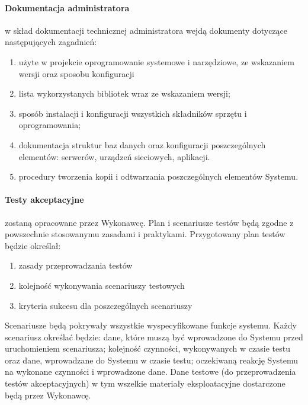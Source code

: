\documentclass{article}
\begin{document}
\paragraph{Dokumentacja administratora}  w skład dokumentacji technicznej administratora wejdą dokumenty dotyczące następujących zagadnień: 
\begin{enumerate}
	\item użyte w projekcie oprogramowanie systemowe i narzędziowe, ze wskazaniem wersji oraz sposobu konfiguracji
	\item lista wykorzystanych bibliotek wraz ze wskazaniem wersji; 
	\item sposób instalacji i konfiguracji wszystkich składników sprzętu i oprogramowania; 
	\item dokumentacja struktur baz danych oraz konfiguracji poszczególnych elementów: serwerów, urządzeń sieciowych, aplikacji. 
	\item procedury tworzenia kopii i odtwarzania poszczególnych elementów Systemu.
\end{enumerate}
\paragraph{Testy akceptacyjne} zostaną opracowane przez Wykonawcę. Plan i scenariusze testów będą zgodne z powszechnie stosowanymu zasadami i praktykami. Przygotowany plan testów będzie określał:
\begin{enumerate}
	\item zasady przeprowadzania testów
	\item kolejność wykonywania scenariuszy testowych
	\item kryteria sukcesu dla poszczególnych scenariuszy
\end{enumerate}
Scenariusze będą pokrywały wszystkie wyspecyfikowane funkcje systemu. Każdy scenariusz określać będzie: dane, które muszą być wprowadzone do Systemu przed uruchomieniem scenariusza; kolejność czynności, wykonywanych w czasie testu oraz dane, wprowadzane do Systemu w czasie testu; oczekiwaną reakcję Systemu na wykonane czynności i wprowadzone dane. Dane testowe (do przeprowadzenia testów akceptacyjnych) w tym wszelkie materiały eksploatacyjne dostarczone będą przez Wykonawcę. 
\end{document}
